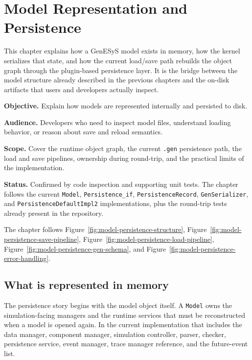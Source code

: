 \chapter{Model Representation and Persistence}
\label{chap:model-representation-and-persistence}

This chapter explains how a GenESyS model exists in memory, how the kernel
serializes that state, and how the current load/save path rebuilds the object
graph through the plugin-based persistence layer. It is the bridge between the
model structure already described in the previous chapters and the on-disk
artifacts that users and developers actually inspect.

\noindent\textbf{Objective.} Explain how models are represented internally and
persisted to disk.

\noindent\textbf{Audience.} Developers who need to inspect model files,
understand loading behavior, or reason about save and reload semantics.

\noindent\textbf{Scope.} Cover the runtime object graph, the current
\texttt{.gen} persistence path, the load and save pipelines, ownership during
round-trip, and the practical limits of the implementation.

\noindent\textbf{Status.} Confirmed by code inspection and supporting unit
tests. The chapter follows the current \texttt{Model}, \texttt{Persistence\_if},
\texttt{PersistenceRecord}, \texttt{GenSerializer}, and
\texttt{PersistenceDefaultImpl2} implementations, plus the round-trip tests
already present in the repository.

The chapter follows Figure~\ref{fig:model-persistence-structure},
Figure~\ref{fig:model-persistence-save-pipeline},
Figure~\ref{fig:model-persistence-load-pipeline},
Figure~\ref{fig:model-persistence-gen-schema}, and
Figure~\ref{fig:model-persistence-error-handling}.

\section{What is represented in memory}
\label{sec:model-persistence-memory-structure}

The persistence story begins with the model object itself. A \texttt{Model}
owns the simulation-facing managers and the runtime services that must be
reconstructed when a model is opened again. In the current implementation that
includes the data manager, component manager, simulation controller, parser,
checker, persistence service, event manager, trace manager reference, and the
future-event list.

